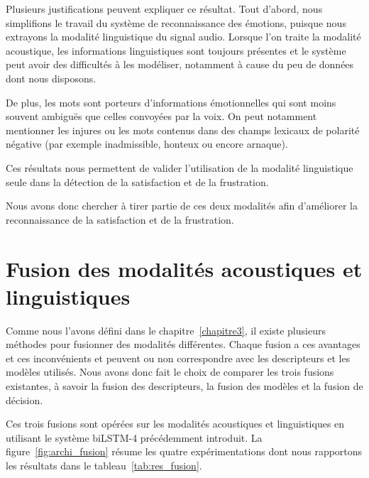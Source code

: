 

Plusieurs justifications peuvent expliquer ce résultat. Tout d'abord, nous simplifions le travail du système de reconnaissance des émotions, puisque nous extrayons la modalité linguistique du signal audio. Lorsque l'on traite la modalité acoustique, les informations linguistiques sont toujours présentes et le système peut avoir des difficultés à les modéliser, notamment à cause du peu de données dont nous disposons.

De plus, les mots sont porteurs d'informations émotionnelles qui sont moins souvent ambiguës que celles convoyées par la voix. On peut notamment mentionner les injures ou les mots contenus dans des champs lexicaux de polarité négative (par exemple inadmissible, honteux ou encore arnaque).

Ces résultats nous permettent de valider l'utilisation de la modalité linguistique seule dans la détection de la satisfaction et de la frustration.

Nous avons donc chercher à tirer partie de ces deux modalités afin d'améliorer la reconnaissance de la satisfaction et de la frustration.

\section{Fusion des modalités acoustiques et linguistiques}
Comme nous l'avons défini dans le chapitre~\ref{chapitre3}, il existe plusieurs méthodes pour fusionner des modalités différentes. Chaque fusion a ces avantages et ces inconvénients et peuvent ou non correspondre avec les descripteurs et les modèles utilisés. Nous avons donc fait le choix de comparer les trois fusions existantes, à savoir la fusion des descripteurs, la fusion des modèles et la fusion de décision.

Ces trois fusions sont opérées sur les modalités acoustiques et linguistiques en utilisant le système biLSTM-4 précédemment introduit. La figure~\ref{fig:archi_fusion} résume les quatre expérimentations dont nous rapportons les résultats dans le tableau~\ref{tab:res_fusion}.



